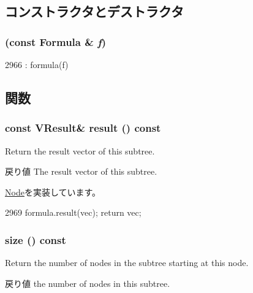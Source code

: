 \subsection{コンストラクタとデストラクタ}
\hypertarget{classStats_1_1FormulaNode_a605459c1f772357240e8bacc151a0b18}{
\subsubsection[{FormulaNode}]{ (const {\bf Formula} \& {\em f})}}
\label{classStats_1_1FormulaNode_a605459c1f772357240e8bacc151a0b18}



\begin{DoxyCode}
2966 : formula(f) {}
\end{DoxyCode}


\subsection{関数}
\hypertarget{classStats_1_1FormulaNode_aba312f9e3431b1652f8b3ddf3fe105dc}{
\subsubsection[{result}]{\setlength{\rightskip}{0pt plus 5cm}const {\bf VResult}\& result () const}}
\label{classStats_1_1FormulaNode_aba312f9e3431b1652f8b3ddf3fe105dc}
Return the result vector of this subtree. \begin{DoxyReturn}{戻り値}
The result vector of this subtree. 
\end{DoxyReturn}


\hyperlink{classStats_1_1Node_a7fcf57115122663db42f39cc18ca0f62}{Node}を実装しています。


\begin{DoxyCode}
2969 { formula.result(vec); return vec; }
\end{DoxyCode}
\hypertarget{classStats_1_1FormulaNode_a503ab01f6c0142145d3434f6924714e7}{
\subsubsection[{size}]{ size () const}}
\label{classStats_1_1FormulaNode_a503ab01f6c0142145d3434f6924714e7}
Return the number of nodes in the subtree starting at this node. \begin{DoxyReturn}{戻り値}
the number of nodes in this subtree. 
\end{DoxyReturn}


